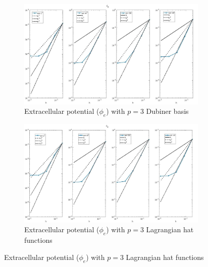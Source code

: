 \documentclass[a4paper,11pt]{article}
\begin{document}
\begin{figure}[H]
\caption{Comparison of the extracellular potential ($\phi_e$)}
\label{phie_3}
\begin{subfigure}{\textwidth}
\begin{center}
\includegraphics[width = \textwidth]{./errors/D3_Phie_1.jpg}
\caption{Extracellular potential ($\phi_e$) with $p=3$ Dubiner basis}
\end{center}
\end{subfigure}
\begin{subfigure}{\textwidth}
\begin{center}
\includegraphics[width =\textwidth]{./errors/P3_Phie_1.jpg}
\caption{Extracellular potential ($\phi_e$) with $p=3$ Lagrangian hat functions}
\end{center}
\end{subfigure}
\end{figure}
\newpage
\end{document}
